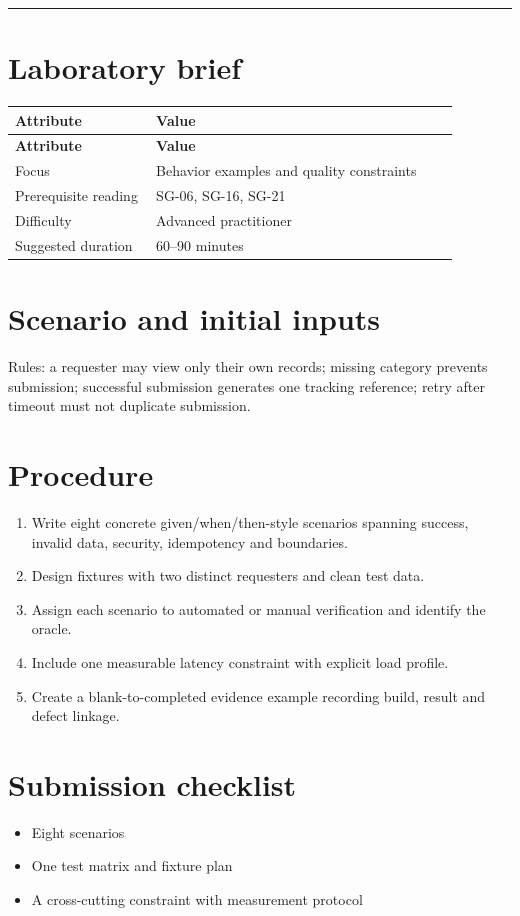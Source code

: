 \documentclass[11pt,letterpaper]{article}
\begin{document}
\tableofcontents\medskip\noindent\rule{\linewidth}{0.4pt}\medskip
\section{Laboratory brief}
\begin{longtable}{|p{0.28\linewidth}|p{0.60\linewidth}|}\hline
\textbf{Attribute} & \textbf{Value} \\ \hline\endfirsthead\hline
\textbf{Attribute} & \textbf{Value} \\ \hline\endhead
Focus & Behavior examples and quality constraints \\ \hline
Prerequisite reading & SG-06, SG-16, SG-21 \\ \hline
Difficulty & Advanced practitioner \\ \hline
Suggested duration & 60–90 minutes \\ \hline
\end{longtable}
\section{Scenario and initial inputs}
Rules: a requester may view only their own records; missing category prevents submission; successful submission generates one tracking reference; retry after timeout must not duplicate submission.

\section{Procedure}
\begin{enumerate}[leftmargin=*,itemsep=3pt]
\item Write eight concrete given/when/then-style scenarios spanning success, invalid data, security, idempotency and boundaries.
\item Design fixtures with two distinct requesters and clean test data.
\item Assign each scenario to automated or manual verification and identify the oracle.
\item Include one measurable latency constraint with explicit load profile.
\item Create a blank-to-completed evidence example recording build, result and defect linkage.
\end{enumerate}
\section{Submission checklist}
\begin{itemize}[leftmargin=*,itemsep=2pt]
\item Eight scenarios
\item One test matrix and fixture plan
\item A cross-cutting constraint with measurement protocol
\end{itemize}
\end{document}
